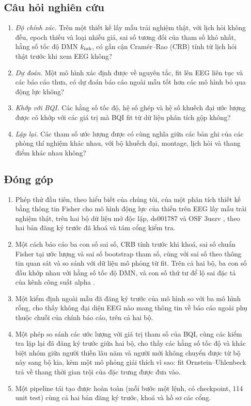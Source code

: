 \subsection{Câu hỏi nghiên cứu}
\begin{enumerate}
  \item[RQ1] \emph{Độ chính xác.} Trên một thiết kế lấy mẫu trải nghiệm thật, với lịch hỏi không đều, epoch thiếu và loại nhiễu giả, sai số tương đối của tham số khó nhất, hằng số tốc độ DMN $k_{\mathrm{inh}}$, có gần cận Cramér--Rao (CRB) tính từ lịch hỏi thật trước khi xem EEG không?
  \item[RQ2] \emph{Dự đoán.} Một mô hình xác định được về nguyên tắc, fit lên EEG liên tục và các báo cáo thưa, có dự đoán báo cáo ngoài mẫu tốt hơn các mô hình bỏ qua động lực không?
  \item[RQ3] \emph{Khớp với BQI.} Các hằng số tốc độ, hệ số ghép và hệ số khuếch đại ước lượng được có khớp với các giá trị mà BQI fit từ dữ liệu phân tích gộp không?
  \item[RQ4] \emph{Lặp lại.} Các tham số ước lượng được có cùng nghĩa giữa các bản ghi của các phòng thí nghiệm khác nhau, với bộ khuếch đại, montage, lịch hỏi và thang điểm khác nhau không?
\end{enumerate}

\subsection{Đóng góp}
\begin{enumerate}
  \item Phép thử đầu tiên, theo hiểu biết của chúng tôi, của một phân tích thiết kế bằng thông tin Fisher cho mô hình động lực của thiền trên EEG lấy mẫu trải nghiệm thật, trên hai bộ dữ liệu mở độc lập, ds001787 \cite{Brandmeyer2018,Delorme2024ds} và OSF 3uszv \cite{RodriguezLarios2021}, theo hai bản đăng ký trước đã khoá và tám cổng kiểm tra.
  \item Một cách báo cáo ba con số sai số, CRB tính trước khi khoá, sai số chuẩn Fisher tại ước lượng và sai số bootstrap tham số, cùng với sai số theo thông tin quan sát và so sánh với dữ liệu mô phỏng từ fit. Trên cả hai bộ, ba con số đầu khớp nhau với hằng số tốc độ DMN, và con số thứ tư để lộ sai đặc tả của kênh công suất alpha \cite{White1982}.
  \item Một kiểm định ngoài mẫu đã đăng ký trước của mô hình so với ba mô hình rỗng, cho thấy không đại diện EEG nào mang thông tin về báo cáo ngoài phụ thuộc chuỗi của chính báo cáo, trên cả hai bộ.
  \item Một phép so sánh các ước lượng với giá trị tham số của BQI, cùng các kiểm tra lặp lại đã đăng ký trước giữa hai bộ, cho thấy các hằng số tốc độ và khác biệt nhóm giữa người thiền lâu năm và người mới không chuyển được từ bộ này sang bộ kia, kèm một mô phỏng giải thích vì sao: fit Ornstein--Uhlenbeck trả về thang thời gian trội của đặc trưng được đưa vào.
  \item Một pipeline tái tạo được hoàn toàn (mỗi bước một lệnh, có checkpoint, 114 unit test) cùng cả hai bản đăng ký trước, khoá và hồ sơ các cổng.
\end{enumerate}

